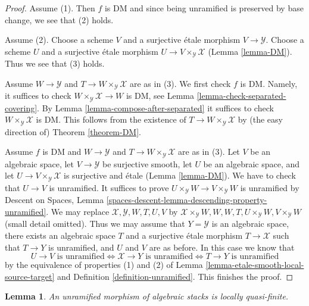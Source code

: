 \documentclass{stacks-project}
\theoremstyle{plain}
\newtheorem{lemma}[subsection]{Lemma}
\theoremstyle{definition}
\theoremstyle{remark}
\numberwithin{equation}{subsection}
\begin{document}
\begin{proof}
Assume (1). Then $f$ is DM and since being unramified is preserved
by base change, we see that (2) holds.

\medskip\noindent
Assume (2). Choose a scheme $V$ and a surjective \'etale morphism
$V \to \mathcal{Y}$. Choose a scheme $U$ and a surjective \'etale morphism
$U \to V \times_\mathcal{Y} \mathcal{X}$ (Lemma \ref{lemma-DM}).
Thus we see that (3) holds.

\medskip\noindent
Assume $W \to \mathcal{Y}$ and $T \to W \times_\mathcal{Y} \mathcal{X}$
are as in (3). We first check $f$ is DM. Namely, it suffices to check
$W \times_\mathcal{Y} \mathcal{X} \to W$ is DM, see
Lemma \ref{lemma-check-separated-covering}.
By Lemma \ref{lemma-compose-after-separated}
it suffices to check $W \times_\mathcal{Y} \mathcal{X}$ is DM.
This follows from the existence of $T \to W \times_\mathcal{Y} \mathcal{X}$
by (the easy direction of) Theorem \ref{theorem-DM}.

\medskip\noindent
Assume $f$ is DM and $W \to \mathcal{Y}$ and
$T \to W \times_\mathcal{Y} \mathcal{X}$ are as in (3).
Let $V$ be an algebraic space, let $V \to \mathcal{Y}$ be surjective smooth,
let $U$ be an algebraic space, and let
$U \to V \times_\mathcal{Y} \mathcal{X}$ is surjective and \'etale
(Lemma \ref{lemma-DM}). We have to check that $U \to V$ is unramified.
It suffices to prove $U \times_\mathcal{Y} W \to V \times_\mathcal{Y} W$
is unramified by Descent on Spaces, Lemma
\ref{spaces-descent-lemma-descending-property-unramified}.
We may replace $\mathcal{X}, \mathcal{Y}, W, T, U, V$ by
$\mathcal{X} \times_\mathcal{Y} W, W, W, T, U \times_\mathcal{Y} W,
V \times_\mathcal{Y} W$ (small detail omitted).
Thus we may assume that $Y = \mathcal{Y}$ is an algebraic space, there exists
an algebraic space $T$ and a surjective \'etale morphism
$T \to \mathcal{X}$ such that $T \to Y$ is unramified, and $U$ and $V$
are as before. In this case we know that
$$
U \to V\text{ is unramified}
\Leftrightarrow
\mathcal{X} \to Y\text{ is unramified}
\Leftrightarrow
T \to Y\text{ is unramified}
$$
by the equivalence of properties (1) and (2) of
Lemma \ref{lemma-etale-smooth-local-source-target}
and Definition \ref{definition-unramified}.
This finishes the proof.
\end{proof}

\begin{lemma}
\label{lemma-unramified-quasi-finite}
An unramified morphism of algebraic stacks is locally quasi-finite.
\end{lemma}
\end{document}

